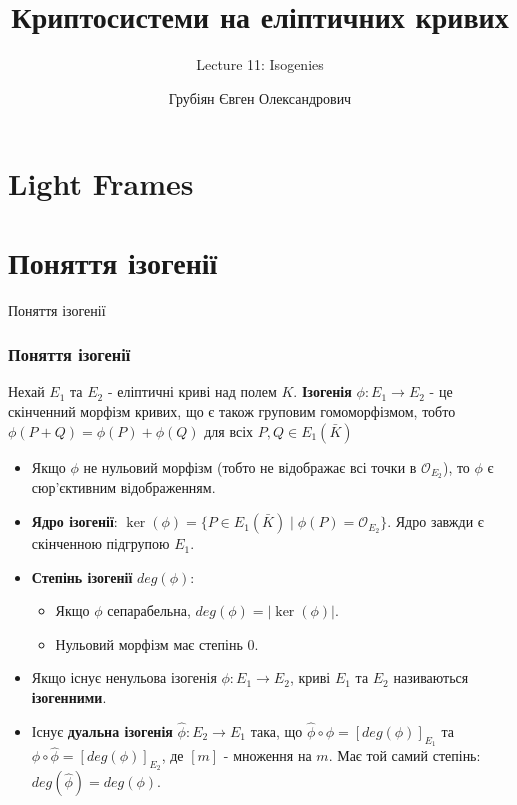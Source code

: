 \documentclass[9pt]{beamer}
\title{Криптосистеми на еліптичних кривих} %
\subtitle{Lecture 11: Isogenies}
\author{Грубіян Євген Олександрович}
\begin{document}
  \frame{\maketitle}


  \begin{darkframes}
      
    \section{Light Frames}


\section{Поняття ізогенії}


\begin{frame}{Поняття ізогенії}
  \frametitle{Поняття ізогенії}
  \begin{definition}
    Нехай $E_1$ та $E_2$ - еліптичні криві над полем $K$. \textbf{Ізогенія} $\phi: E_1 \to E_2$ - це скінченний морфізм кривих, що є також груповим гомоморфізмом, тобто $\phi(P+Q) = \phi(P) + \phi(Q)$ для всіх $P, Q \in E_1(\bar{K})$
  \end{definition}
  \begin{itemize}
    \item Якщо $\phi$ не нульовий морфізм (тобто не відображає всі точки в $\mathcal{O}_{E_2}$), то $\phi$ є сюр'єктивним відображенням.
    \item \textbf{Ядро ізогенії}: $\ker(\phi) = \{ P \in E_1(\bar{K}) \mid \phi(P) = \mathcal{O}_{E_2} \}$. Ядро завжди є скінченною підгрупою $E_1$.
    \item \textbf{Степінь ізогенії} $deg(\phi)$:
      \begin{itemize}
        \item Якщо $\phi$ сепарабельна, $deg(\phi) = |\ker(\phi)|$.
        \item Нульовий морфізм має степінь 0.
      \end{itemize}
    \item Якщо існує ненульова ізогенія $\phi: E_1 \to E_2$, криві $E_1$ та $E_2$ називаються \textbf{ізогенними}.
    \item Існує \textbf{дуальна ізогенія} $\hat{\phi}: E_2 \to E_1$ така, що $\hat{\phi} \circ \phi = [ deg(\phi) ]_{E_1}$ та $\phi \circ \hat{\phi} = [ deg(\phi) ]_{E_2}$, де $[m]$ - множення на $m$. Має той самий степінь: $deg(\hat{\phi}) = deg(\phi)$.
  \end{itemize}
\end{frame}


\end{darkframes}
\end{document}
